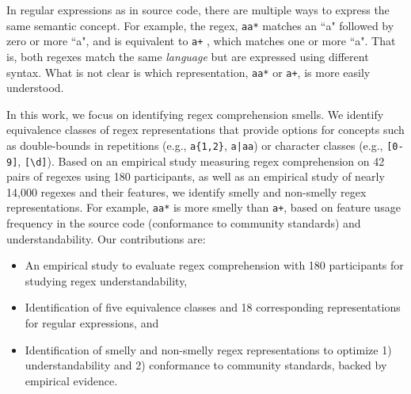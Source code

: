 In regular expressions as in source code, there are multiple ways to express the same semantic concept.
For example, the regex, \verb!aa*! matches an ``a" followed by zero or more ``a", and is equivalent to \verb!a+! , which matches one or more ``a".
That is, both regexes match the same \emph{language} but are expressed using different syntax. What is not clear is which representation, \verb!aa*! or \verb!a+!, is more easily understood.

In this work, we focus on identifying regex comprehension smells.
We identify equivalence classes of regex representations that provide options for concepts such as double-bounds in repetitions (e.g., \verb!a{1,2}!, \verb!a|aa!) or
character classes (e.g., \verb![0-9]!, \verb![\d]!).
Based on an empirical study measuring regex comprehension on 42 pairs of regexes using 180 participants, as well as an empirical study of nearly 14,000 regexes and their features, we identify smelly and non-smelly regex representations. For example, \verb!aa*! is more smelly than \verb!a+!, based on feature usage frequency in the source code (conformance to community standards) and understandability.
Our contributions are:

\vspace{-3pt}
\begin{itemize}
\item An empirical study to evaluate regex comprehension with 180 participants for studying regex understandability,
\item Identification of five equivalence classes and 18 corresponding representations for regular expressions, and
\item Identification of smelly and non-smelly regex representations to optimize 1) understandability and 2) conformance to community standards, backed by empirical evidence.
\end{itemize}
\vspace{-3pt}

